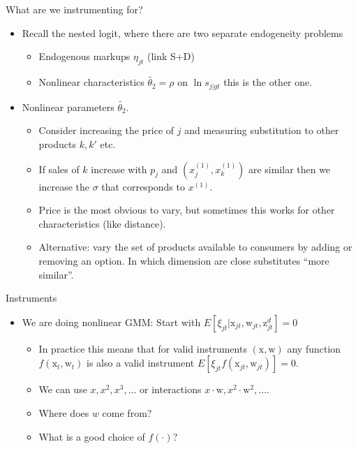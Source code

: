 \documentclass[aspectratio=169,11pt]{beamer}
\begin{document}
\begin{frame}{What are we instrumenting for?}
\begin{itemize}
\item Recall the nested logit, where there are two separate endogeneity problems
\begin{itemize}
\item Endogenous \alert{markups} $\eta_{jt}$ (link S+D)
\item \alert{Nonlinear characteristics} $\widetilde{\theta_2}=\rho$ on $\ln s_{j|gt}$ this is the other one.
\end{itemize}
\item Nonlinear parameters $\widetilde{\theta_2}$.
\begin{itemize}
\item Consider increasing the price of $j$ and measuring substitution to other products $k,k'$ etc.
\item If sales of $k$ increase with $p_j$ and $(x_j^{(1)},x_k^{(1)})$ are similar then we increase the $\sigma$ that corresponds to $x^{(1)}$.
\item Price is the most obvious to vary, but sometimes this works for other characteristics (like distance).
\item Alternative: vary the set of products available to consumers by adding or removing an option. In which dimension are close substitutes ``more similar''.
\end{itemize}
\end{itemize}
\end{frame}






\begin{frame}{Instruments}
\begin{itemize}
\item We are doing nonlinear GMM: Start with $E[\xi_{jt} | \mathrm{x}_{jt}, \mathrm{w}_{jt},\mathrm{z}_{jt}^d]=0$
\begin{itemize}
\item In practice this means that for valid instruments $(\mathrm{x},\mathrm{w})$ any function $f(\mathrm{x}_t,\mathrm{w}_t)$ is also a valid instrument $E[ \xi_{jt} f(\mathrm{x}_{jt},\mathrm{w}_{jt})]=0$.
\item We can use $x, x^2, x^3,\ldots$ or interactions $x \cdot \mathrm{w}, x^2 \cdot \mathrm{w}^2, \ldots$.
\item Where does $w$ come from?
\item What is a good choice of $f(\cdot)$?
\end{itemize}
\end{itemize}
\end{frame}
\end{document}

